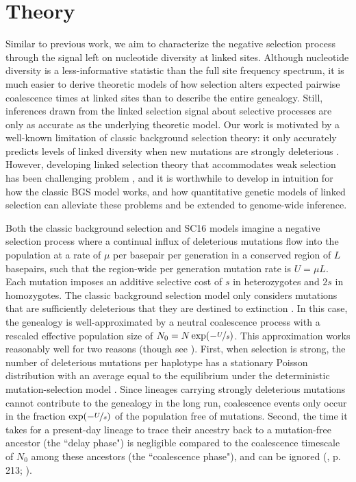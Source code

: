 \documentclass[11pt]{article}
\begin{document}
\section*{Theory}

Similar to previous work, we aim to characterize the negative selection process
through the signal left on nucleotide diversity at linked sites. Although
nucleotide diversity is a less-informative statistic than the full site
frequency spectrum, it is much easier to derive theoretic models of how
selection alters expected pairwise coalescence times at linked sites than to
describe the entire genealogy. Still, inferences drawn from the linked
selection signal about selective processes are only as accurate as the
underlying theoretic model. Our work is motivated by a well-known limitation of
classic background selection theory: it only accurately predicts levels of
linked diversity when new mutations are strongly deleterious
\parencite{Charlesworth1993-gb,McVean2000-bt,Good2013-lp,Gordo2002-dr}.
However, developing linked selection theory that accommodates weak selection
has been challenging problem \parencite{Good2014-yz,Haigh1978-gt,Higgs1995-xc},
and it is worthwhile to develop in intuition for how the classic BGS model
works, and how quantitative genetic models of linked selection can alleviate
these problems and be extended to genome-wide inference.

Both the classic background selection and SC16 models imagine a negative
selection process where a continual influx of deleterious mutations flow into
the population at a rate of $\mu$ per basepair per generation in a conserved
region of $L$ basepairs, such that the region-wide per generation mutation rate
is $U = \mu L$. Each mutation imposes an additive selective cost of $s$ in
heterozygotes and $2s$ in homozygotes. The classic background selection model
only considers mutations that are sufficiently deleterious that they are
destined to extinction
\parencite{Charlesworth1993-gb,Nordborg1996-nq,Hudson1995-pt,Hudson1994-oh}. In
this case, the genealogy is well-approximated by a neutral coalescence process
with a rescaled effective population size of $N_0 = N \exp(-\nicefrac{U}{s})$.
This approximation works reasonably well for two reasons (though see
\cite{Cvijovic2018-vd,Walczak2012-fi,Nicolaisen2012-vs}). First, when selection
is strong, the number of deleterious mutations per haplotype has a stationary
Poisson distribution with an average equal to the equilibrium under the
deterministic mutation-selection model \parencite{Haldane1927-ga}. Since
lineages carrying strongly deleterious mutations cannot contribute to the
genealogy in the long run, coalescence events only occur in the fraction
$\exp(-\nicefrac{U}{s})$ of the population free of mutations. Second, the time
it takes for a present-day lineage to trace their ancestry back to a
mutation-free ancestor (the ``delay phase") is negligible compared to the
coalescence timescale of $N_0$ among these ancestors (the ``coalescence
phase"), and can be ignored (\cite{Durrett2008-ql}, p. 213;
\cite{Good2014-yz}).
\end{document}
